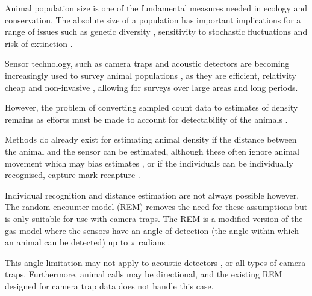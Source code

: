 Animal population size is one of the fundamental measures needed in ecology and conservation. The absolute size of a population has important implications for a range of issues such as genetic diversity \citep{o1985genetic, fischer2000genetic, willi2005threefold}, sensitivity to stochastic fluctuations \citep{richter1972extinction,wright1983stochastic} and risk of extinction \citep{purvis2000predicting}.

Sensor technology, such as camera traps \citep{rowcliffe2008surveys,ahumada2011community} and acoustic detectors \citep{ofarrel1999comparison,mellinger2007fixed,jones2011indicator} are becoming increasingly used to survey animal populations \citep{rowcliffe2008surveys, kessel2014review}, as they are efficient, relativity cheap and non-invasive \citep{gese2001monitoring, o2003crouching, silveira2003camera}, allowing for surveys over large areas and long periods. 


However, the problem of converting sampled count data to estimates of density remains as efforts must be made to account for detectability of the animals \citep{dail2011models, chandler2011inference}.


Methods do already exist for estimating animal density if the distance between the animal and the sensor can be estimated, although these often ignore animal movement which may bias estimates \citep{barlow2005estimates, marques2011estimating}, or if the individuals can be individually recognised, capture-mark-recapture \citep{karanth1995, trolle2003estimation, soisalo2006estimating, trolle2007camera}.


Individual recognition and distance estimation are not always possible however. The random encounter model (REM) removes the need for these assumptions but is only suitable for use with camera traps. The REM is a modified version of the gas model where the sensors have an angle of detection (the angle within which an animal can be detected) up to $\pi$ radians \citep{rowcliffe2008estimating}. 

This angle limitation may not apply to acoustic detectors \citep{adams2012you}, or all types of camera traps. Furthermore, animal calls may be directional, and the existing REM designed for camera trap data does not handle this case.

